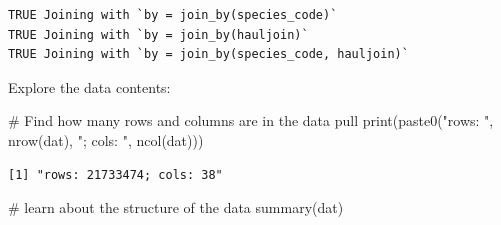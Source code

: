 \documentclass[
  letterpaper,
  oneside,
  open=any]{scrbook}
\newenvironment{Shaded}{\begin{snugshade}}{\end{snugshade}}
\newcommand{\CommentTok}[1]{\textcolor[rgb]{0.37,0.37,0.37}{#1}}
\newcommand{\FunctionTok}[1]{\textcolor[rgb]{0.28,0.35,0.67}{#1}}
\newcommand{\NormalTok}[1]{\textcolor[rgb]{0.00,0.23,0.31}{#1}}
\newcommand{\StringTok}[1]{\textcolor[rgb]{0.13,0.47,0.30}{#1}}
\begin{document}
\begin{verbatim}
TRUE Joining with `by = join_by(species_code)`
TRUE Joining with `by = join_by(hauljoin)`
TRUE Joining with `by = join_by(species_code, hauljoin)`
\end{verbatim}

Explore the data contents:

\begin{Shaded}
\begin{Highlighting}[]
\CommentTok{\# Find how many rows and columns are in the data pull}
\FunctionTok{print}\NormalTok{(}\FunctionTok{paste0}\NormalTok{(}\StringTok{"rows: "}\NormalTok{, }\FunctionTok{nrow}\NormalTok{(dat), }\StringTok{"; cols: "}\NormalTok{, }\FunctionTok{ncol}\NormalTok{(dat)))}
\end{Highlighting}
\end{Shaded}

\begin{verbatim}
[1] "rows: 21733474; cols: 38"
\end{verbatim}

\begin{Shaded}
\begin{Highlighting}[]
\CommentTok{\# learn about the structure of the data}
\FunctionTok{summary}\NormalTok{(dat)}
\end{Highlighting}
\end{Shaded}
\end{document}
